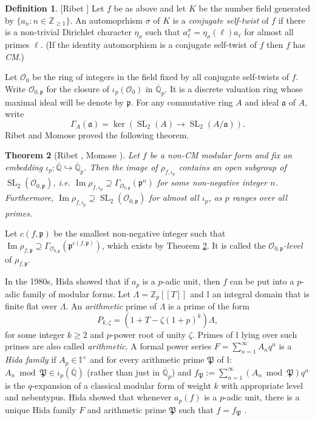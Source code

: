 \documentclass[11pt]{amsart}
\newtheorem{thm}{Theorem}[section]
\theoremstyle{definition}
\newtheorem{defn}[thm]{Definition}
\theoremstyle{remark}
\def\Aa{\mathfrak{a}}
\def\I{\mathbb{I}}
\def\OK{\mathcal{O}}
\def\p{\mathfrak{p}}
\def\Pp{\mathfrak{P}}
\def\Q{\mathbb{Q}}
\def\Z{\mathbb{Z}}
\DeclareMathOperator{\im}{Im}
\DeclareMathOperator{\SL}{SL}
\newcommand{\qtn}[1]{\textcolor{red}{#1}}
\begin{document}
\begin{defn}\label{cst defn}[Ribet \cite{Ribet77}]
Let $f$ be as above and let $K$ be the number field generated by $\{a_n : n \in \Z_{\geq 1}\}$.  An automoprhism $\sigma$ of $K$ is a \textit{conjugate self-twist} of $f$ if there is a non-trivial Dirichlet character $\eta_\sigma$ such that $a_\ell^{\sigma} = \eta_\sigma(\ell)a_\ell$ for almost all primes $\ell$.  (If the identity automorphism is a conjugate self-twist of $f$ then $f$ has \textit{CM}.)
\end{defn}

Let $\OK_0$ be the ring of integers in the field fixed by all conjugate self-twists of $f$.  Write $\OK_{0, \p}$ for the closure of $\iota_p(\OK_0)$ in $\overline{\Q}_p$.  It is a discrete valuation ring whose maximal ideal will be denote by $\p$.  For any commutative ring $A$ and ideal $\Aa$ of $A$, write 
\[
\Gamma_{A}(\Aa) = \ker(\SL_2(A) \to \SL_2(A/\Aa)).
\]
Ribet and Momose proved the following theorem.

\begin{thm}[Ribet \cite{Ribet83}, Momose \cite{Momose81}]\label{RibetMomose}
Let $f$ be a non-CM modular form and fix an embedding $\iota_p : \overline{\Q} \hookrightarrow \overline{\Q}_p$.  Then the image of $\rho_{f, \iota_p}$ contains an open subgroup of $\SL_2(\OK_{0, \p})$, i.e. $\im \rho_{f, \iota_p} \supseteq \Gamma_{\OK_{0, \p}}(\p^n)$ for some non-negative integer $n$.  Furthermore, $\im \rho_{f, \iota_p} \supseteq \SL_2(\OK_{0, \p})$ for almost all $\iota_p$, as $p$ ranges over all primes. %
\end{thm}

Let $c(f, \p)$ be the smallest non-negative integer such that $\im \rho_{f, \p} \supseteq \Gamma_{\OK_{0,\p}}(\p^{c(f, \p)})$, which exists by Theorem \ref{RibetMomose}.  It is called the \textit{$\OK_{0, \p}$-level} of $\rho_{f, \p}$.

In the 1980s, Hida showed that if $a_p$ is a $p$-adic unit, then $f$ can be put into a $p$-adic family of modular forms.  Let $\Lambda = \Z_p[[T]]$ and $\I$ an integral domain that is finite flat over $\Lambda$.  An \textit{arithmetic} prime of $\Lambda$ is a prime of the form 
\begin{equation}\label{arithmetic prime}
P_{k, \zeta} = (1 + T - \zeta(1 + p)^k)\Lambda,
\end{equation}
for some integer $k \geq 2$ and $p$-power root of unity $\zeta$.  Primes of $\I$ lying over such primes are also called \textit{arithmetic}.  A formal power series $F = \sum_{n = 1}^\infty A_nq^n$ is a \textit{Hida family} if $A_p \in \I^\times$ and for every arithmetic prime $\Pp$ of $\I$: $A_n \bmod \Pp \in \iota_p(\overline{\Q})$ (rather than just in $\overline{\Q}_p$) and $f_\Pp := \sum_{n = 1}^\infty (A_n \bmod \Pp)q^n$ is the $q$-expansion of a classical modular form of weight $k$ with appropriate level and nebentypus.  Hida showed that whenever $a_p(f)$ is a $p$-adic unit, there is a unique Hida family $F$ and arithmetic prime $\Pp$ such that $f = f_\Pp$ \cite{Hida86a}.
\end{document}

